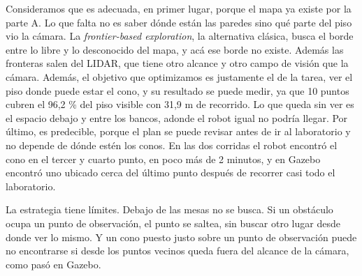 Consideramos que es adecuada, en primer lugar, porque el mapa ya existe por
la parte A. Lo que falta no es saber dónde están las paredes sino qué parte
del piso vio la cámara. La \emph{frontier-based exploration}, la alternativa clásica,
busca el borde entre lo libre y lo desconocido del mapa, y acá ese borde no
existe. Además las fronteras salen del LIDAR, que tiene otro alcance y otro
campo de visión que la cámara. Además, el objetivo que optimizamos es
justamente el de la tarea, ver el piso donde puede estar el cono, y su
resultado se puede medir, ya que 10 puntos cubren el 96,2 \% del piso visible con
31,9 m de recorrido. Lo que queda sin ver es el espacio debajo y entre los
bancos, adonde el robot igual no podría llegar. Por último, es predecible, porque el
plan se puede revisar antes de ir al laboratorio y no depende de dónde estén
los conos. En las dos corridas el robot encontró el cono en el tercer y
cuarto punto, en poco más de 2 minutos, y en Gazebo encontró uno ubicado
cerca del último punto después de recorrer casi todo el laboratorio.

La estrategia tiene límites. Debajo de las mesas no se busca. Si un obstáculo
ocupa un punto de observación, el punto se saltea, sin buscar otro lugar
desde donde ver lo mismo. Y un cono puesto justo sobre un
punto de observación puede no encontrarse si desde los puntos vecinos queda
fuera del alcance de la cámara, como pasó en Gazebo.

\FloatBarrier
